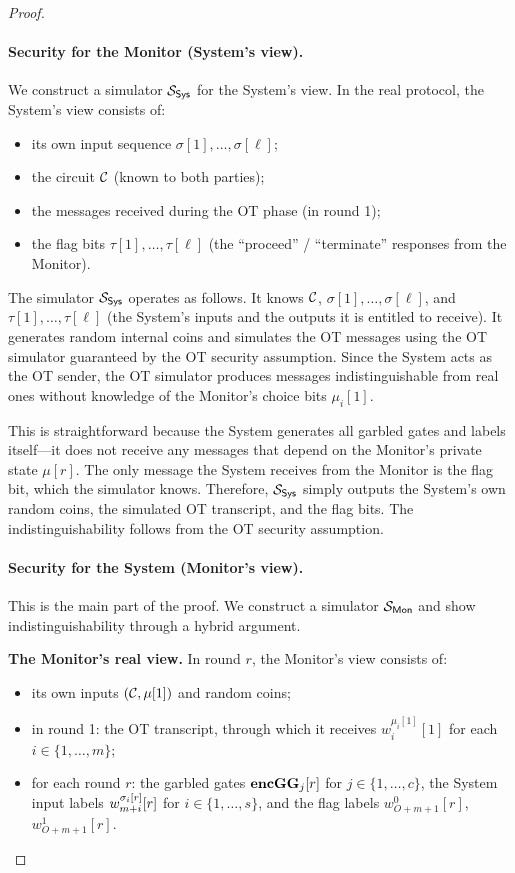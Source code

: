 \begin{proof}
\paragraph{Security for the Monitor (System's view).}
We construct a simulator $\mathcal{S}_{\textsf{Sys}}$ for the System's view. In the real protocol, the System's view consists of:
\begin{itemize}
    \item its own input sequence $\sigma[1], \ldots, \sigma[\ell]$;
    \item the circuit $\mathcal{C}$ (known to both parties);
    \item the messages received during the OT phase (in round 1);
    \item the flag bits $\tau[1], \ldots, \tau[\ell]$ (the ``proceed'' / ``terminate'' responses from the Monitor).
\end{itemize}

The simulator $\mathcal{S}_{\textsf{Sys}}$ operates as follows. It knows $\mathcal{C}$, $\sigma[1], \ldots, \sigma[\ell]$, and $\tau[1], \ldots, \tau[\ell]$ (the System's inputs and the outputs it is entitled to receive). It generates random internal coins and simulates the OT messages using the OT simulator guaranteed by the OT security assumption. Since the System acts as the OT sender, the OT simulator produces messages indistinguishable from real ones without knowledge of the Monitor's choice bits $\mu_i[1]$.

This is straightforward because the System generates all garbled gates and labels itself---it does not receive any messages that depend on the Monitor's private state $\mu[r]$. The only message the System receives from the Monitor is the flag bit, which the simulator knows. Therefore, $\mathcal{S}_{\textsf{Sys}}$ simply outputs the System's own random coins, the simulated OT transcript, and the flag bits. The indistinguishability follows from the OT security assumption.

\paragraph{Security for the System (Monitor's view).}
This is the main part of the proof. We construct a simulator $\mathcal{S}_{\textsf{Mon}}$ and show indistinguishability through a hybrid argument.

\medskip
\noindent\textbf{The Monitor's real view.} In round $r$, the Monitor's view consists of:
\begin{itemize}
    \item its own inputs $(\mathcal{C}, \mu[1])$ and random coins;
    \item in round 1: the OT transcript, through which it receives $w_i^{\mu_i[1]}[1]$ for each $i \in \{1, \ldots, m\}$;
    \item for each round $r$: the garbled gates $\textbf{encGG}_j[r]$ for $j \in \{1, \ldots, c\}$, the System input labels $w_{m+i}^{\sigma_i[r]}[r]$ for $i \in \{1, \ldots, s\}$, and the flag labels $w_{O+m+1}^0[r]$, $w_{O+m+1}^1[r]$.
\end{itemize}


\end{proof}
